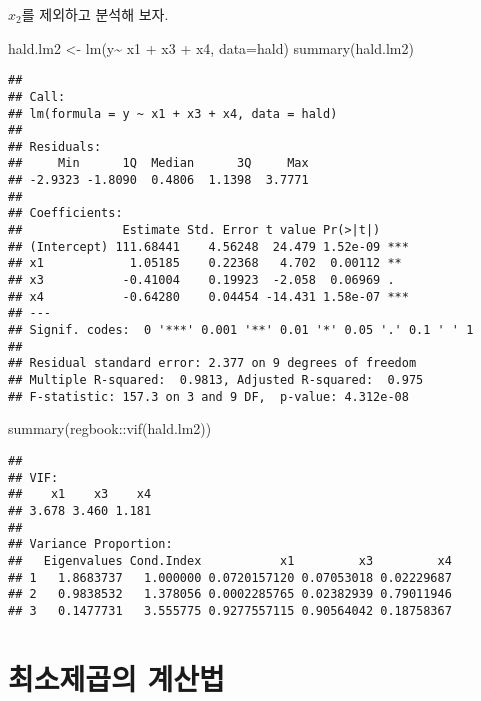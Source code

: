 \documentclass[
]{book}
\newenvironment{Shaded}{\begin{snugshade}}{\end{snugshade}}
\newcommand{\AttributeTok}[1]{\textcolor[rgb]{0.77,0.63,0.00}{#1}}
\newcommand{\FunctionTok}[1]{\textcolor[rgb]{0.00,0.00,0.00}{#1}}
\newcommand{\NormalTok}[1]{#1}
\newcommand{\OtherTok}[1]{\textcolor[rgb]{0.56,0.35,0.01}{#1}}
\newcommand{\SpecialCharTok}[1]{\textcolor[rgb]{0.00,0.00,0.00}{#1}}
\begin{document}
\(x_2\)를 제외하고 분석해 보자.

\begin{Shaded}
\begin{Highlighting}[]
\NormalTok{hald.lm2 }\OtherTok{\textless{}{-}} \FunctionTok{lm}\NormalTok{(y}\SpecialCharTok{\textasciitilde{}}\NormalTok{ x1 }\SpecialCharTok{+}\NormalTok{ x3 }\SpecialCharTok{+}\NormalTok{ x4, }\AttributeTok{data=}\NormalTok{hald)}
\FunctionTok{summary}\NormalTok{(hald.lm2)}
\end{Highlighting}
\end{Shaded}

\begin{verbatim}
## 
## Call:
## lm(formula = y ~ x1 + x3 + x4, data = hald)
## 
## Residuals:
##     Min      1Q  Median      3Q     Max 
## -2.9323 -1.8090  0.4806  1.1398  3.7771 
## 
## Coefficients:
##              Estimate Std. Error t value Pr(>|t|)    
## (Intercept) 111.68441    4.56248  24.479 1.52e-09 ***
## x1            1.05185    0.22368   4.702  0.00112 ** 
## x3           -0.41004    0.19923  -2.058  0.06969 .  
## x4           -0.64280    0.04454 -14.431 1.58e-07 ***
## ---
## Signif. codes:  0 '***' 0.001 '**' 0.01 '*' 0.05 '.' 0.1 ' ' 1
## 
## Residual standard error: 2.377 on 9 degrees of freedom
## Multiple R-squared:  0.9813, Adjusted R-squared:  0.975 
## F-statistic: 157.3 on 3 and 9 DF,  p-value: 4.312e-08
\end{verbatim}

\begin{Shaded}
\begin{Highlighting}[]
\FunctionTok{summary}\NormalTok{(regbook}\SpecialCharTok{::}\FunctionTok{vif}\NormalTok{(hald.lm2))}
\end{Highlighting}
\end{Shaded}

\begin{verbatim}
## 
## VIF:
##    x1    x3    x4 
## 3.678 3.460 1.181 
## 
## Variance Proportion:
##   Eigenvalues Cond.Index           x1         x3         x4
## 1   1.8683737   1.000000 0.0720157120 0.07053018 0.02229687
## 2   0.9838532   1.378056 0.0002285765 0.02382939 0.79011946
## 3   0.1477731   3.555775 0.9277557115 0.90564042 0.18758367
\end{verbatim}

\hypertarget{compute}{%
\chapter{최소제곱의 계산법}\label{compute}}
\end{document}
